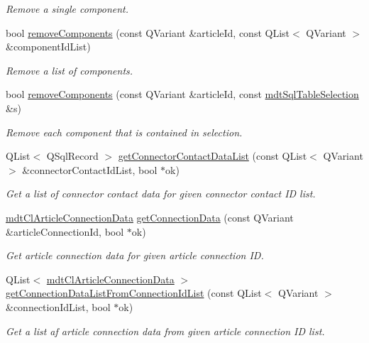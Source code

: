 \begin{DoxyCompactItemize}
\begin{DoxyCompactList}\small\item\em Remove a single component. \end{DoxyCompactList}\item 
bool \hyperlink{classmdt_cl_article_a95fb4303d579cc13e590de21f2ad7d52}{remove\-Components} (const Q\-Variant \&article\-Id, const Q\-List$<$ Q\-Variant $>$ \&component\-Id\-List)
\begin{DoxyCompactList}\small\item\em Remove a list of components. \end{DoxyCompactList}\item 
bool \hyperlink{classmdt_cl_article_ad238a08f352cb789481401bdff8d0bde}{remove\-Components} (const Q\-Variant \&article\-Id, const \hyperlink{classmdt_sql_table_selection}{mdt\-Sql\-Table\-Selection} \&s)
\begin{DoxyCompactList}\small\item\em Remove each component that is contained in selection. \end{DoxyCompactList}\item 
Q\-List$<$ Q\-Sql\-Record $>$ \hyperlink{classmdt_cl_article_ab2f39d61d3cb50c4bfe7805fd1611169}{get\-Connector\-Contact\-Data\-List} (const Q\-List$<$ Q\-Variant $>$ \&connector\-Contact\-Id\-List, bool $\ast$ok)
\begin{DoxyCompactList}\small\item\em Get a list of connector contact data for given connector contact I\-D list. \end{DoxyCompactList}\item 
\hyperlink{classmdt_cl_article_connection_data}{mdt\-Cl\-Article\-Connection\-Data} \hyperlink{classmdt_cl_article_a2c591965b47436ddf946c94bb7017dee}{get\-Connection\-Data} (const Q\-Variant \&article\-Connection\-Id, bool $\ast$ok)
\begin{DoxyCompactList}\small\item\em Get article connection data for given article connection I\-D. \end{DoxyCompactList}\item 
Q\-List$<$ \hyperlink{classmdt_cl_article_connection_data}{mdt\-Cl\-Article\-Connection\-Data} $>$ \hyperlink{classmdt_cl_article_a687fa2ef645c2345cf70e3435f8b34e8}{get\-Connection\-Data\-List\-From\-Connection\-Id\-List} (const Q\-List$<$ Q\-Variant $>$ \&connection\-Id\-List, bool $\ast$ok)
\begin{DoxyCompactList}\small\item\em Get a list af article connection data from given article connection I\-D list. \end{DoxyCompactList}\item 

\end{DoxyCompactItemize}
